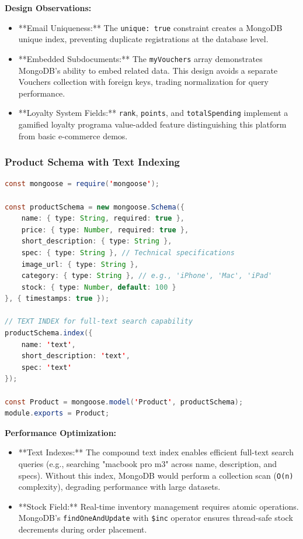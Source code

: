 \documentclass[12pt, a4paper]{report}
\begin{document}
\textbf{Design Observations:}
\begin{itemize}
    \item **Email Uniqueness:** The \texttt{unique: true} constraint creates a MongoDB unique index, preventing duplicate registrations at the database level.
    \item **Embedded Subdocuments:** The \texttt{myVouchers} array demonstrates MongoDB's ability to embed related data. This design avoids a separate Vouchers collection with foreign keys, trading normalization for query performance.
    \item **Loyalty System Fields:** \texttt{rank}, \texttt{points}, and \texttt{totalSpending} implement a gamified loyalty programa value-added feature distinguishing this platform from basic e-commerce demos.
\end{itemize}

\subsubsection{Product Schema with Text Indexing}

\begin{lstlisting}[language=Java, caption=Product Schema with Search Optimization (model/Product.js)]
const mongoose = require('mongoose');

const productSchema = new mongoose.Schema({
    name: { type: String, required: true },
    price: { type: Number, required: true },
    short_description: { type: String },
    spec: { type: String }, // Technical specifications
    image_url: { type: String },
    category: { type: String }, // e.g., 'iPhone', 'Mac', 'iPad'
    stock: { type: Number, default: 100 }
}, { timestamps: true });

// TEXT INDEX for full-text search capability
productSchema.index({
    name: 'text',
    short_description: 'text',
    spec: 'text'
});

const Product = mongoose.model('Product', productSchema);
module.exports = Product;
\end{lstlisting}

\textbf{Performance Optimization:}
\begin{itemize}
    \item **Text Indexes:** The compound text index enables efficient full-text search queries (e.g., searching "macbook pro m3" across name, description, and specs). Without this index, MongoDB would perform a collection scan (\texttt{O(n)} complexity), degrading performance with large datasets.
    \item **Stock Field:** Real-time inventory management requires atomic operations. MongoDB's \texttt{findOneAndUpdate} with \texttt{\$inc} operator ensures thread-safe stock decrements during order placement.
\end{itemize}
\end{document}
